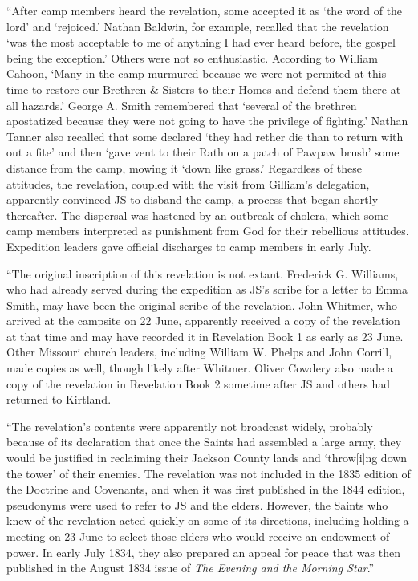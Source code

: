 			``After camp members heard the revelation, some accepted it as `the word of the lord' and `rejoiced.' Nathan Baldwin, for example, recalled that the revelation `was the most acceptable to me of anything I had ever heard before, the gospel being the exception.' Others were not so enthusiastic. According to William Cahoon, `Many in the camp murmured because we were not permited at this time to restore our Brethren \& Sisters to their Homes and defend them there at all hazards.' George A. Smith remembered that `several of the brethren apostatized because they were not going to have the privilege of fighting.' Nathan Tanner also recalled that some declared `they had rether die than to return with out a fite' and then `gave vent to their Rath on a patch of Pawpaw brush' some distance from the camp, mowing it `down like grass.' Regardless of these attitudes, the revelation, coupled with the visit from Gilliam's delegation, apparently convinced JS to disband the camp, a process that began shortly thereafter. The dispersal was hastened by an outbreak of cholera, which some camp members interpreted as punishment from God for their rebellious attitudes. Expedition leaders gave official discharges to camp members in early July.
			
			``The original inscription of this revelation is not extant. Frederick G. Williams, who had already served during the expedition as JS's scribe for a letter to Emma Smith, may have been the original scribe of the revelation. John Whitmer, who arrived at the campsite on 22 June, apparently received a copy of the revelation at that time and may have recorded it in Revelation Book 1 as early as 23 June. Other Missouri church leaders, including William W. Phelps and John Corrill, made copies as well, though likely after Whitmer. Oliver Cowdery also made a copy of the revelation in Revelation Book 2 sometime after JS and others had returned to Kirtland.
			
			``The revelation's contents were apparently not broadcast widely, probably because of its declaration that once the Saints had assembled a large army, they would be justified in reclaiming their Jackson County lands and `throw[i]ng down the tower' of their enemies. The revelation was not included in the 1835 edition of the Doctrine and Covenants, and when it was first published in the 1844 edition, pseudonyms were used to refer to JS and the elders. However, the Saints who knew of the revelation acted quickly on some of its directions, including holding a meeting on 23 June to select those elders who would receive an endowment of power. In early July 1834, they also prepared an appeal for peace that was then published in the August 1834 issue of \textit{The Evening and the Morning Star}.''
						
